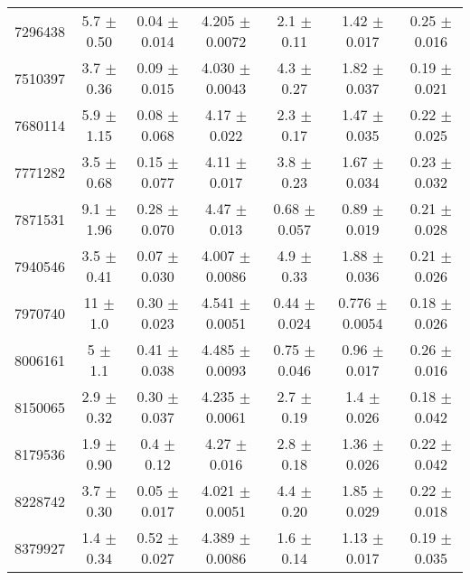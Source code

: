 \begin{table*}
\begin{tabular}{c|cccccc}
7296438  &        5.7    $\pm$  0.50   &      0.04   $\pm$  0.014  &      4.205  $\pm$  0.0072 &      2.1    $\pm$  0.11   &      1.42   $\pm$  0.017  &      0.25   $\pm$  0.016    \\
7510397  &        3.7    $\pm$  0.36   &      0.09   $\pm$  0.015  &      4.030  $\pm$  0.0043 &      4.3    $\pm$  0.27   &      1.82   $\pm$  0.037  &      0.19   $\pm$  0.021    \\
7680114  &        5.9    $\pm$  1.15   &      0.08   $\pm$  0.068  &      4.17   $\pm$  0.022  &      2.3    $\pm$  0.17   &      1.47   $\pm$  0.035  &      0.22   $\pm$  0.025    \\
7771282  &        3.5    $\pm$  0.68   &      0.15   $\pm$  0.077  &      4.11   $\pm$  0.017  &      3.8    $\pm$  0.23   &      1.67   $\pm$  0.034  &      0.23   $\pm$  0.032    \\
7871531  &        9.1    $\pm$  1.96   &      0.28   $\pm$  0.070  &      4.47   $\pm$  0.013  &      0.68   $\pm$  0.057  &      0.89   $\pm$  0.019  &      0.21   $\pm$  0.028    \\
7940546  &        3.5    $\pm$  0.41   &      0.07   $\pm$  0.030  &      4.007  $\pm$  0.0086 &      4.9    $\pm$  0.33   &      1.88   $\pm$  0.036  &      0.21   $\pm$  0.026    \\
7970740  &       11      $\pm$  1.0    &      0.30   $\pm$  0.023  &      4.541  $\pm$  0.0051 &      0.44   $\pm$  0.024  &      0.776  $\pm$  0.0054 &      0.18   $\pm$  0.026    \\
8006161  &        5      $\pm$  1.1    &      0.41   $\pm$  0.038  &      4.485  $\pm$  0.0093 &      0.75   $\pm$  0.046  &      0.96   $\pm$  0.017  &      0.26   $\pm$  0.016    \\
8150065  &        2.9    $\pm$  0.32   &      0.30   $\pm$  0.037  &      4.235  $\pm$  0.0061 &      2.7    $\pm$  0.19   &      1.4    $\pm$  0.026  &      0.18   $\pm$  0.042    \\
8179536  &        1.9    $\pm$  0.90   &      0.4    $\pm$  0.12   &      4.27   $\pm$  0.016  &      2.8    $\pm$  0.18   &      1.36   $\pm$  0.026  &      0.22   $\pm$  0.042    \\
8228742  &        3.7    $\pm$  0.30   &      0.05   $\pm$  0.017  &      4.021  $\pm$  0.0051 &      4.4    $\pm$  0.20   &      1.85   $\pm$  0.029  &      0.22   $\pm$  0.018    \\
8379927  &        1.4    $\pm$  0.34   &      0.52   $\pm$  0.027  &      4.389  $\pm$  0.0086 &      1.6    $\pm$  0.14   &      1.13   $\pm$  0.017  &      0.19   $\pm$  0.035    \\

\end{tabular}
\end{table*}
